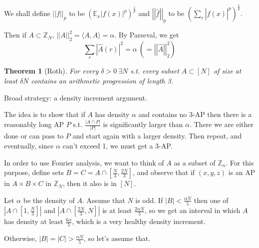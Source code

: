 \documentclass[a4paper]{article}
\newtheorem{theorem}[lemma]{Theorem}
\newcommand*\abs[1]{\left|#1\right|}
\newcommand*\norm[1]{\abs{\abs{#1}}}
\begin{document}
We shall define $\norm{f}_p$ to be $(\mathbb{E}_x\abs{f(x)}^p)^{\frac{1}{p}}$ and $\norm{\hat{f}}_p$ to be $\left(\sum_{r}\abs{\hat{f}(x)}^p\right)^{\frac{1}{p}}$.

Then if $A \subset \mathbb{Z}_N$, $\norm{A}_2^2 = \langle A,A\rangle = \alpha$. By Parseval, we get $$\sum_r \abs{\hat{A}(r)}^2 = \alpha\ \left(= \norm{\hat{A}}_2^2\right)$$

\begin{theorem}[Roth]
	For every $\delta > 0\ \exists N$ s.t. every subset $A \subset [N]$ of size at least $\delta N$ contains an arithmetic progression of length 3.
\end{theorem}

Broad strategy: a density increment argument.

The idea is to show that if $A$ has density $\alpha$ and contains no 3-AP then there is a reasonably long AP $P$ s.t. $\frac{\abs{A\cap P}}{\abs{P}}$ is significantly larger than $\alpha$. There we are either done or can pass to $P$ and start again with a larger density. Then repeat, and eventually, since $\alpha$ can't exceed 1, we must get a 3-AP.

In order to use Fourier analysis, we want to think of $A$ as a subset of $\mathbb{Z}_n$. For this purpose, define sets $B=C=A \cap \left[\frac{N}{3},\frac{2N}{3}\right]$, and observe that if $(x, y, z)$ is an AP in $A \times B \times C$ in $\mathbb{Z}_N$, then it also is in $[N]$.

Let $\alpha$ be the density of $A$. Assume that $N$ is odd. If $\abs{B} < \frac{\alpha N}{5}$ then one of $\abs{A \cap \left[1, \frac{N}{3}\right]}$ and $\abs{A \cap \left[\frac{2N}{3}, N\right]}$ is at least $\frac{2\alpha N}{5}$, so we get an interval in which $A$ has density at least $\frac{6\alpha}{5}$, which is a very healthy density increment.

Otherwise, $\abs{B}=\abs{C} > \frac{\alpha N}{5}$, so let's assume that.
\end{document}
